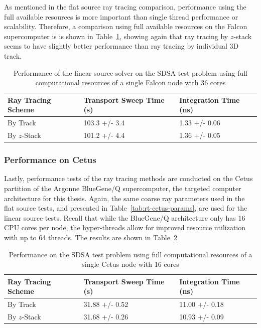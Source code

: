 As mentioned in the flat source ray tracing comparison,  performance using the full available resources is more important than single thread performance or scalability. Therefore, a comparison using full available resources on the Falcon supercomputer is is shown in Table~\ref{tab:rt-full-thread-ls}, showing again that ray tracing by $z$-stack seems to have slightly better performance than ray tracing by individual 3D track.

\begin{table}[ht]
	\centering
	\caption{Performance of the linear source solver on the SDSA test problem using full computational resources of a single Falcon node with 36 cores}
	\medskip
	\begin{tabular}{l|l|l}
		\hline
		Ray Tracing Scheme & Transport Sweep Time (s) & Integration Time (ns) \\
		\hline
		By Track & 103.3 +/- 3.4 & 1.33 +/- 0.06 \\
		By $z$-Stack & 101.2 +/- 4.4 & 1.36 +/- 0.05 \\
		\hline
	\end{tabular}
	\label{tab:rt-full-thread-ls}
\end{table}

\subsubsection{Performance on Cetus}

Lastly, performance tests of the ray tracing methods are conducted on the Cetus partition of the Argonne BlueGene/Q supercomputer, the targeted computer architecture for this thesis. Again, the same coarse ray parameters used in the flat source tests, and presented in Table~\ref{tab:rt-cetus-params}, are used for the linear source tests. Recall that while the BlueGene/Q architecture only has 16 CPU cores per node, the hyper-threads allow for improved resource utilization with up to 64 threads. The results are shown in Table~\ref{tab:rt-full-thread-cetus-ls}

\begin{table}[ht]
	\centering
	\caption{Performance on the SDSA test problem using full computational resources of a single Cetus node with 16 cores}
	\medskip
	\begin{tabular}{l|l|l}
		\hline
		Ray Tracing Scheme & Transport Sweep Time (s) & Integration Time (ns) \\
		\hline
		By Track & 31.88 +/- 0.52 & 11.00 +/- 0.18 \\
		By $z$-Stack & 31.68 +/- 0.26 & 10.93 +/- 0.09 \\
		\hline
	\end{tabular}
	\label{tab:rt-full-thread-cetus-ls}
\end{table}

